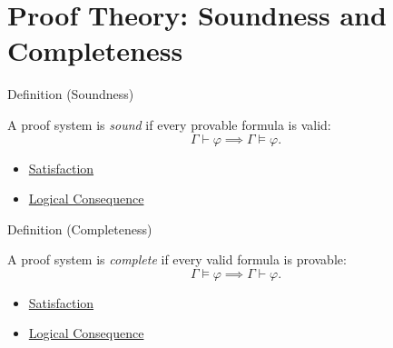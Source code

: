 
\section{Proof Theory: Soundness and Completeness}


\begin{definitionbox}{Definition (Soundness)}
\begin{definition}[Soundness]\label{def:fol-soundness}
A proof system is \emph{sound} if every provable formula is valid:
\[
\Gamma \vdash \varphi \implies \Gamma \models \varphi.
\]
\end{definition}
\end{definitionbox}

\begin{dependencies}
\begin{itemize}
  \item \hyperref[def:fol-satisfaction]{Satisfaction}
  \item \hyperref[def:log-consequence]{Logical Consequence}
\end{itemize}
\end{dependencies}

\begin{definitionbox}{Definition (Completeness)}
\begin{definition}[Completeness]\label{def:fol-completeness}
A proof system is \emph{complete} if every valid formula is provable:
\[
\Gamma \models \varphi \implies \Gamma \vdash \varphi.
\]
\end{definition}
\end{definitionbox}

\begin{dependencies}
\begin{itemize}
  \item \hyperref[def:fol-satisfaction]{Satisfaction}
  \item \hyperref[def:log-consequence]{Logical Consequence}
\end{itemize}
\end{dependencies}

